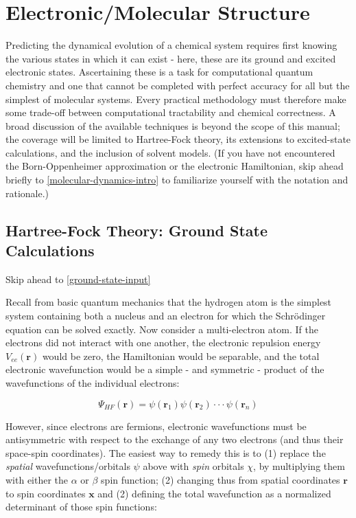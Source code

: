 \documentclass[12pt,letter,footinclude=true,headinclude=true,hyphens]{book} %
\begin{document}
    \chapter{Electronic/Molecular Structure}
    
    \label{electronic-structure-intro}
    
    Predicting the dynamical evolution of a chemical system requires first knowing the various states in which it can exist - here, these are its ground and excited electronic states. Ascertaining these is a task for computational quantum chemistry and one that cannot be completed with perfect accuracy for all but the simplest of molecular systems. Every practical methodology must therefore make some trade-off between computational tractability and chemical correctness. A broad discussion of the available techniques is beyond the scope of this manual; the coverage will be limited to Hartree-Fock theory, its extensions to excited-state calculations, and the inclusion of solvent models. (If you have not encountered the Born-Oppenheimer approximation or the electronic Hamiltonian, skip ahead briefly to \ref{molecular-dynamics-intro} to familiarize yourself with the notation and rationale.)
    
    \section{Hartree-Fock Theory: Ground State Calculations}
    
    Skip ahead to \ref{ground-state-input}
    
    Recall from basic quantum mechanics that the hydrogen atom is the simplest system containing both a nucleus and an electron for which the Schr\"{o}dinger equation can be solved exactly. Now consider a multi-electron atom. If the electrons did not interact with one another, the electronic repulsion energy $V_{ee}(\mathbf{r})$ would be zero, the Hamiltonian would be separable, and the total electronic wavefunction would be a simple - and symmetric - product of the wavefunctions of the individual electrons:
    
    \begin{equation}
    \Psi_{HF}(\mathbf{r}) = \psi(\mathbf{r}_1)\psi(\mathbf{r}_2) \cdot \cdot \cdot \psi(\mathbf{r}_n)
    \end{equation}
    
    However, since electrons are fermions, electronic wavefunctions must be antisymmetric with respect to the exchange of any two electrons (and thus their space-spin coordinates). The easiest way to remedy this is to (1) replace the \emph{spatial} wavefunctions/orbitals $\psi$ above with \emph{spin} orbitals $\chi$, by multiplying them with either the $\alpha$ or $\beta$ spin function; (2) changing thus from spatial coordinates $\mathbf{r}$ to spin coordinates $\mathbf{x}$ and (2) defining the total wavefunction as a normalized determinant of those spin functions:
    
\end{document}
